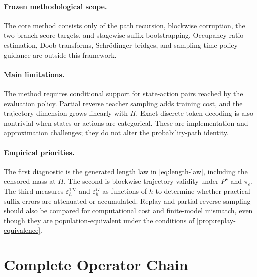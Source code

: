 \documentclass[11pt]{article}
\theoremstyle{definition}
\theoremstyle{remark}
\newcommand{\TV}{\operatorname{TV}}
\newcommand{\targetpi}{\pi_e}
\begin{document}
\paragraph{Frozen methodological scope.}
The core method consists only of the path recursion, blockwise corruption, the
two branch score targets, and stagewise suffix bootstrapping. Occupancy-ratio
estimation, Doob transforms, Schr\"odinger bridges, and sampling-time policy
guidance are outside this framework.

\paragraph{Main limitations.}
The method requires conditional support for state-action pairs reached by the
evaluation policy. Partial reverse teacher sampling adds training cost, and the
trajectory dimension grows linearly with $H$. Exact discrete token decoding is
also nontrivial when states or actions are categorical. These are
implementation and approximation challenges; they do not alter the
probability-path identity.

\paragraph{Empirical priorities.}
The first diagnostic is the generated length law in \cref{eq:length-law},
including the censored mass at $H$. The second is blockwise trajectory
validity under $P^\star$ and $\targetpi$. The third measures
$\varepsilon_h^{\TV}$ and $\varepsilon_h^G$ as functions of $h$ to determine
whether practical suffix errors are attenuated or accumulated. Replay and
partial reverse sampling should also be compared for computational cost and
finite-model mismatch, even though they are population-equivalent under the
conditions of \cref{prop:replay-equivalence}.

\section{Complete Operator Chain}
\label{sec:summary}
\end{document}
